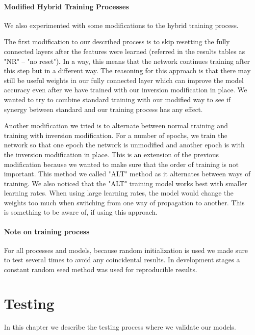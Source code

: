\documentclass[b5paper]{book}
\begin{document}
\subsubsection{Modified Hybrid Training Processes}

We also experimented with some modifications to the hybrid training process.

The first modification to our described process is to skip resetting the fully connected layers after the features were learned (referred in the results tables as "NR" -- "no reset").  In a way, this means that the network continues training after this step but in a different way. The reasoning for this approach is that there may still be useful weights in our fully connected layer which can improve the model accuracy even after we have trained with our inversion modification in place. We wanted to try to combine standard training with our modified way to see if synergy between standard and our training process has any effect.

Another modification we tried is to alternate between normal training and training with inversion modification. For a number of epochs, we train the network so that one epoch the network is unmodified and another epoch is with the inversion modification in place. This is an extension of the previous modification because we wanted to make sure that the order of training is not important. This method we called "ALT" method as it alternates between ways of training. We also noticed that the "ALT" training model works best with smaller learning rates. When using large learning rates, the model would change the weights too much when switching from one way of propagation to another. This is something to be aware of, if using this approach.

\subsubsection{Note on training process}

For all processes and models, because random initialization is used we made sure to test several times to avoid any coincidental results. In development stages a constant random seed method was used for reproducible results.

\chapter{Testing}

In this chapter we describe the testing process where we validate our models.
\end{document}
